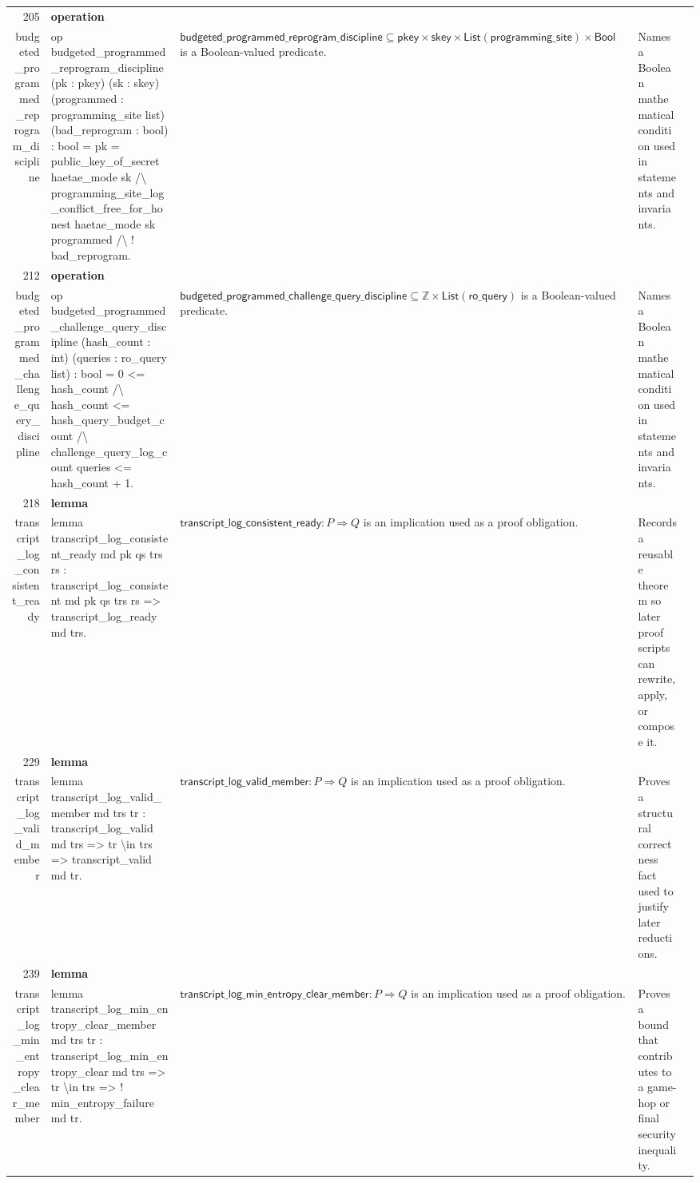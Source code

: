 \documentclass[10pt]{article}
\newcommand{\ec}[1]{\begingroup\ttfamily\scriptsize #1\endgroup}
\begin{document}
\begin{longtable}{r L{0.17\textwidth} L{0.26\textwidth} L{0.27\textwidth} L{0.20\textwidth}}
205 & \textbf{operation}\\\ec{budgeted\_programmed\_reprogram\_discipline} & \ec{op budgeted\_programmed\_reprogram\_discipline (pk : pkey) (sk : skey) (programmed : programming\_site list) (bad\_reprogram : bool) : bool = pk = public\_key\_of\_secret haetae\_mode sk /\textbackslash{} programming\_site\_log\_conflict\_free\_for\_honest haetae\_mode sk programmed /\textbackslash{} ! bad\_reprogram.} & \(\mathsf{budgeted\_programmed\_reprogram\_discipline} \subseteq \mathsf{pkey} \times \mathsf{skey} \times \mathsf{List}(\mathsf{programming\_site}) \times \mathsf{Bool}\) is a Boolean-valued predicate. & Names a Boolean mathematical condition used in statements and invariants. \\
212 & \textbf{operation}\\\ec{budgeted\_programmed\_challenge\_query\_discipline} & \ec{op budgeted\_programmed\_challenge\_query\_discipline (hash\_count : int) (queries : ro\_query list) : bool = 0 <= hash\_count /\textbackslash{} hash\_count <= hash\_query\_budget\_count /\textbackslash{} challenge\_query\_log\_count queries <= hash\_count + 1.} & \(\mathsf{budgeted\_programmed\_challenge\_query\_discipline} \subseteq \mathbb{Z} \times \mathsf{List}(\mathsf{ro\_query})\) is a Boolean-valued predicate. & Names a Boolean mathematical condition used in statements and invariants. \\
218 & \textbf{lemma}\\\ec{transcript\_log\_consistent\_ready} & \ec{lemma transcript\_log\_consistent\_ready md pk qs trs rs : transcript\_log\_consistent md pk qs trs rs => transcript\_log\_ready md trs.} & \(\mathsf{transcript\_log\_consistent\_ready} : P \Rightarrow Q\) is an implication used as a proof obligation. & Records a reusable theorem so later proof scripts can rewrite, apply, or compose it. \\
229 & \textbf{lemma}\\\ec{transcript\_log\_valid\_member} & \ec{lemma transcript\_log\_valid\_member md trs tr : transcript\_log\_valid md trs => tr \textbackslash{}in trs => transcript\_valid md tr.} & \(\mathsf{transcript\_log\_valid\_member} : P \Rightarrow Q\) is an implication used as a proof obligation. & Proves a structural correctness fact used to justify later reductions. \\
239 & \textbf{lemma}\\\ec{transcript\_log\_min\_entropy\_clear\_member} & \ec{lemma transcript\_log\_min\_entropy\_clear\_member md trs tr : transcript\_log\_min\_entropy\_clear md trs => tr \textbackslash{}in trs => ! min\_entropy\_failure md tr.} & \(\mathsf{transcript\_log\_min\_entropy\_clear\_member} : P \Rightarrow Q\) is an implication used as a proof obligation. & Proves a bound that contributes to a game-hop or final security inequality. \\

\end{longtable}
\end{document}
